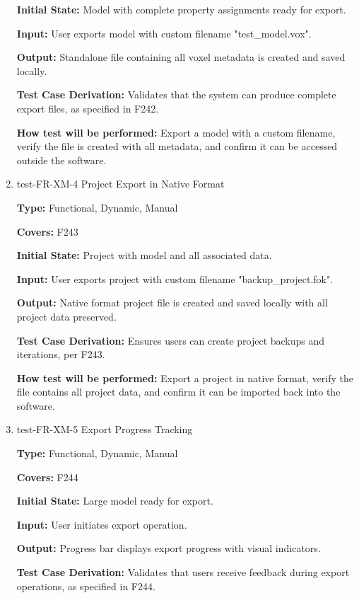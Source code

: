 \documentclass[12pt, titlepage]{article}
\begin{document}
\begin{enumerate}
\textbf{Initial State:} Model with complete property assignments ready for export.
					
\textbf{Input:} User exports model with custom filename "test\_model.vox".
					
\textbf{Output:} Standalone file containing all voxel metadata is created and saved locally.

\textbf{Test Case Derivation:} Validates that the system can produce complete export files, as specified in F242.
					
\textbf{How test will be performed:} Export a model with a custom filename, verify the file is created with all metadata, and confirm it can be accessed outside the software.

\item{test-FR-XM-4 Project Export in Native Format\\}

\textbf{Type:} Functional, Dynamic, Manual

\textbf{Covers:} F243
					
\textbf{Initial State:} Project with model and all associated data.
					
\textbf{Input:} User exports project with custom filename "backup\_project.fok".
					
\textbf{Output:} Native format project file is created and saved locally with all project data preserved.

\textbf{Test Case Derivation:} Ensures users can create project backups and iterations, per F243.
					
\textbf{How test will be performed:} Export a project in native format, verify the file contains all project data, and confirm it can be imported back into the software.

\item{test-FR-XM-5 Export Progress Tracking\\}

\textbf{Type:} Functional, Dynamic, Manual

\textbf{Covers:} F244
					
\textbf{Initial State:} Large model ready for export.
					
\textbf{Input:} User initiates export operation.
					
\textbf{Output:} Progress bar displays export progress with visual indicators.

\textbf{Test Case Derivation:} Validates that users receive feedback during export operations, as specified in F244.
					

\end{enumerate}
\end{document}
